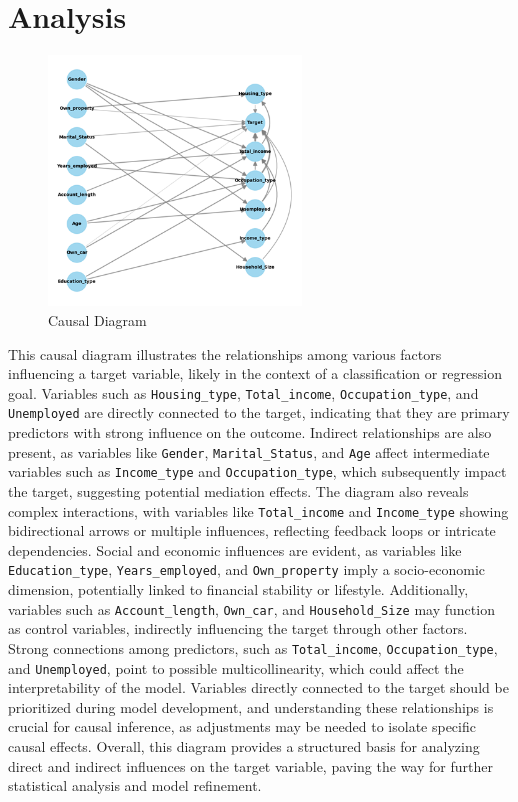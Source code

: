 \documentclass[12pt]{report}
\begin{document}
    \section{Analysis}

    \begin{figure}[h!]
        \centering
        \includegraphics[width=0.6\textwidth]{resources/pic/causal diagram.png}
        \caption{Causal Diagram}
        \label{fig:causal diagram}
    \end{figure}

    This causal diagram illustrates the relationships among various factors influencing a target variable, likely in the context of a classification or regression goal. Variables such as \texttt{Housing\_type}, \texttt{Total\_income}, \texttt{Occupation\_type}, and \texttt{Unemployed} are directly connected to the target, indicating that they are primary predictors with strong influence on the outcome. Indirect relationships are also present, as variables like \texttt{Gender}, \texttt{Marital\_Status}, and \texttt{Age} affect intermediate variables such as \texttt{Income\_type} and \texttt{Occupation\_type}, which subsequently impact the target, suggesting potential mediation effects. The diagram also reveals complex interactions, with variables like \texttt{Total\_income} and \texttt{Income\_type} showing bidirectional arrows or multiple influences, reflecting feedback loops or intricate dependencies. Social and economic influences are evident, as variables like \texttt{Education\_type}, \texttt{Years\_employed}, and \texttt{Own\_property} imply a socio-economic dimension, potentially linked to financial stability or lifestyle. Additionally, variables such as \texttt{Account\_length}, \texttt{Own\_car}, and \texttt{Household\_Size} may function as control variables, indirectly influencing the target through other factors. Strong connections among predictors, such as \texttt{Total\_income}, \texttt{Occupation\_type}, and \texttt{Unemployed}, point to possible multicollinearity, which could affect the interpretability of the model. Variables directly connected to the target should be prioritized during model development, and understanding these relationships is crucial for causal inference, as adjustments may be needed to isolate specific causal effects. Overall, this diagram provides a structured basis for analyzing direct and indirect influences on the target variable, paving the way for further statistical analysis and model refinement.
\end{document}
